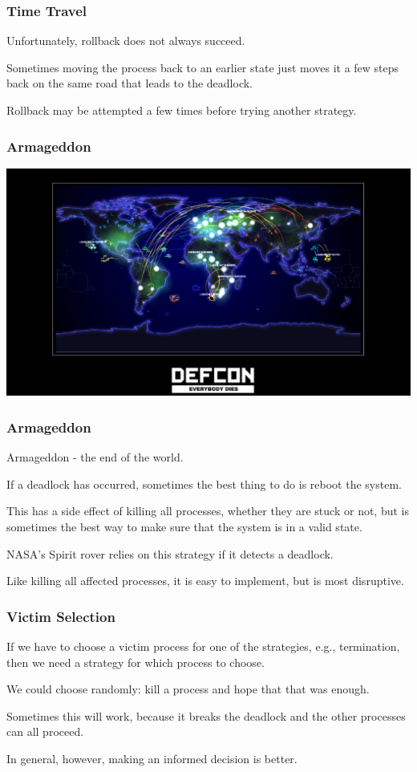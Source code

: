 \begin{frame}
\frametitle{Time Travel}

Unfortunately, rollback does not always succeed. 

Sometimes moving the process back to an earlier state just moves it a few steps back on the same road that leads to the deadlock.  

Rollback may be attempted a few times before trying another strategy.

\end{frame}


\begin{frame}
\frametitle{Armageddon}

\begin{center}
	\includegraphics[width=\textwidth]{images/defcon.jpg}
\end{center}

\end{frame}


\begin{frame}
\frametitle{Armageddon}

Armageddon - the end of the world. 

If a deadlock has occurred, sometimes the best thing to do is reboot the system. 

This has a side effect of killing all processes, whether they are stuck or not, but is sometimes the best way to make sure that the system is in a valid state. 

NASA's Spirit rover relies on this strategy if it detects a deadlock. 

Like killing all affected processes, it is easy to implement, but is most disruptive.

\end{frame}

\begin{frame}
\frametitle{Victim Selection}

If we have to choose a victim process for one of the strategies, e.g., termination, then we need a strategy for which process to choose. 

We could choose randomly: kill a process and hope that that was enough. 

Sometimes this will work, because it breaks the deadlock and the other processes can all proceed. 

In general, however, making an informed decision is better. 

\end{frame}

